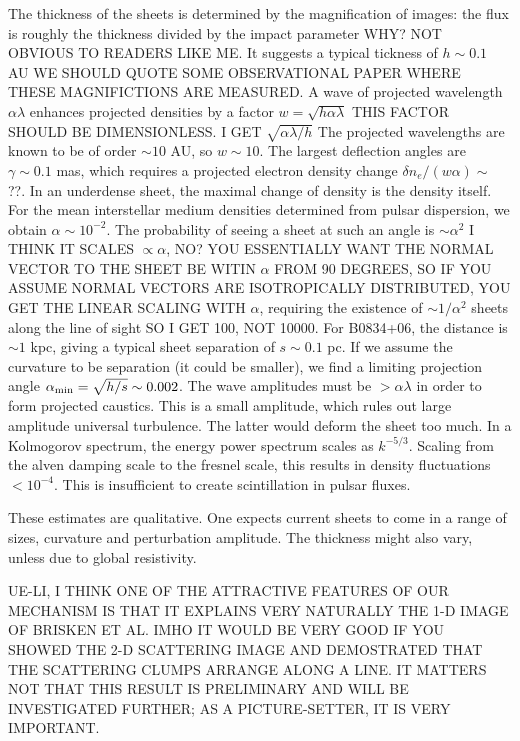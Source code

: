 \documentclass[useAMS,usenatbib]{mn2e}
\begin{document}
The thickness of the sheets is determined by the magnification of
images: the flux is roughly the thickness divided by the impact
parameter WHY? NOT OBVIOUS TO READERS LIKE ME.  
It suggests a typical tickness of $h\sim 0.1$ AU WE SHOULD QUOTE SOME
OBSERVATIONAL PAPER WHERE THESE MAGNIFICTIONS ARE MEASURED.  A wave
of projected wavelength $\alpha \lambda$ enhances projected densities
by a factor $w=\sqrt{h \alpha \lambda}$ THIS FACTOR SHOULD BE 
DIMENSIONLESS. I GET $\sqrt{\alpha\lambda/h}$  The projected wavelengths
are known to be of order $\sim 10$ AU, so $w \sim 10$.  The largest
deflection angles are $\gamma \sim 0.1$ mas, which requires a
projected electron density change $\delta n_e/(w\alpha) \sim$ ??.  In an
underdense sheet, the maximal change of density is the density itself.
For the mean interstellar medium densities determined from pulsar
dispersion, we obtain $\alpha \sim 10^{-2}$.  The probability of
seeing a sheet at such an angle is $\sim \alpha^2$ I THINK IT SCALES
$\propto \alpha$, NO? YOU ESSENTIALLY WANT THE NORMAL VECTOR TO
THE SHEET BE WITIN $\alpha$ FROM 90 DEGREES, SO IF YOU ASSUME NORMAL VECTORS
ARE ISOTROPICALLY DISTRIBUTED, YOU GET THE LINEAR SCALING WITH $\alpha$, requiring the
existence of $\sim 1/\alpha^2$ sheets along the line of sight SO I GET 100, NOT
10000.  For
B0834+06, the distance is $\sim 1$ kpc, giving a typical sheet
separation of $s \sim 0.1$ pc.  If we assume the curvature to be
separation (it could be smaller), we find a limiting projection angle
$\alpha_{\rm min} = \sqrt{h/s} \sim 0.002$.  The wave amplitudes must
be $> \alpha \lambda$ in order to form projected caustics.  This is a
small amplitude, which rules out large amplitude universal turbulence.
The latter would deform the sheet too much.  In a Kolmogorov spectrum,
the energy power spectrum scales as $k^{-5/3}$.  Scaling from the
alven damping scale to the fresnel scale, this results in density
fluctuations $< 10^{-4}$.  This is insufficient to create
scintillation in pulsar fluxes.

These estimates are qualitative.  One expects current sheets to come
in a range of sizes, curvature and perturbation amplitude.  The
thickness might also vary, unless due to global resistivity.

UE-LI, I THINK ONE OF THE ATTRACTIVE FEATURES OF OUR MECHANISM IS THAT IT EXPLAINS VERY NATURALLY THE 1-D IMAGE OF BRISKEN ET AL. IMHO IT WOULD BE VERY GOOD IF YOU SHOWED
THE 2-D SCATTERING IMAGE AND DEMOSTRATED THAT THE SCATTERING CLUMPS ARRANGE ALONG A 
LINE. IT MATTERS NOT THAT THIS RESULT IS PRELIMINARY AND WILL BE INVESTIGATED FURTHER;
AS A PICTURE-SETTER, IT IS VERY IMPORTANT.
\end{document}
